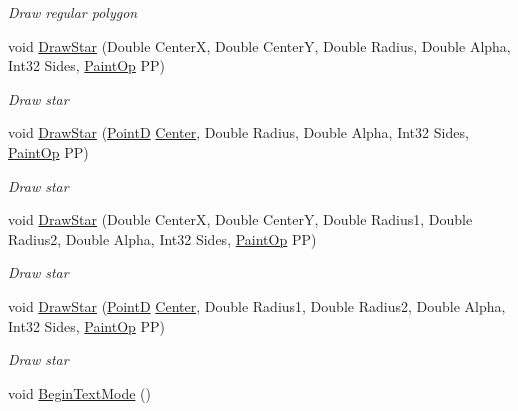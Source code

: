 \begin{DoxyCompactItemize}
\begin{DoxyCompactList}\small\item\em Draw regular polygon \end{DoxyCompactList}\item 
void \hyperlink{class_pdf_file_writer_1_1_pdf_contents_addd4a203a8375817981fed82e100dbee}{Draw\+Star} (Double CenterX, Double CenterY, Double Radius, Double Alpha, Int32 Sides, \hyperlink{namespace_pdf_file_writer_a1bd0bc3fdabed20e2459496f1bbe2101}{Paint\+Op} PP)
\begin{DoxyCompactList}\small\item\em Draw star \end{DoxyCompactList}\item 
void \hyperlink{class_pdf_file_writer_1_1_pdf_contents_ac2fb101cd9e2f0ca5e75170c1bcf0acc}{Draw\+Star} (\hyperlink{class_pdf_file_writer_1_1_point_d}{PointD} \hyperlink{namespace_pdf_file_writer_a3991bfacc8c7be240452dd24ec817157a4f1f6016fc9f3f2353c0cc7c67b292bd}{Center}, Double Radius, Double Alpha, Int32 Sides, \hyperlink{namespace_pdf_file_writer_a1bd0bc3fdabed20e2459496f1bbe2101}{Paint\+Op} PP)
\begin{DoxyCompactList}\small\item\em Draw star \end{DoxyCompactList}\item 
void \hyperlink{class_pdf_file_writer_1_1_pdf_contents_aab2cf89f5c728b4da6121728db46472f}{Draw\+Star} (Double CenterX, Double CenterY, Double Radius1, Double Radius2, Double Alpha, Int32 Sides, \hyperlink{namespace_pdf_file_writer_a1bd0bc3fdabed20e2459496f1bbe2101}{Paint\+Op} PP)
\begin{DoxyCompactList}\small\item\em Draw star \end{DoxyCompactList}\item 
void \hyperlink{class_pdf_file_writer_1_1_pdf_contents_a18580d96bcd7b327c98643181bc496cf}{Draw\+Star} (\hyperlink{class_pdf_file_writer_1_1_point_d}{PointD} \hyperlink{namespace_pdf_file_writer_a3991bfacc8c7be240452dd24ec817157a4f1f6016fc9f3f2353c0cc7c67b292bd}{Center}, Double Radius1, Double Radius2, Double Alpha, Int32 Sides, \hyperlink{namespace_pdf_file_writer_a1bd0bc3fdabed20e2459496f1bbe2101}{Paint\+Op} PP)
\begin{DoxyCompactList}\small\item\em Draw star \end{DoxyCompactList}\item 
void \hyperlink{class_pdf_file_writer_1_1_pdf_contents_a9085b37a83dd4dc1c20a4d425c0a80ef}{Begin\+Text\+Mode} ()\hypertarget{class_pdf_file_writer_1_1_pdf_contents_a9085b37a83dd4dc1c20a4d425c0a80ef}{}\label{class_pdf_file_writer_1_1_pdf_contents_a9085b37a83dd4dc1c20a4d425c0a80ef}


\end{DoxyCompactItemize}
